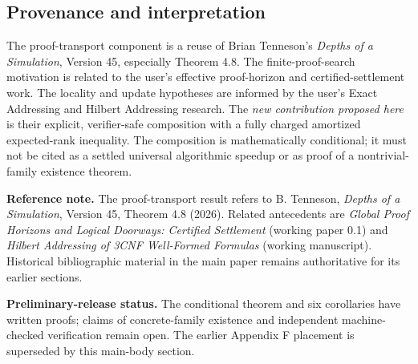 \documentclass[11pt,letterpaper]{article}
\theoremstyle{definition}
\theoremstyle{remark}
\begin{document}
\subsection{Provenance and interpretation}
The proof-transport component is a reuse of Brian Tenneson's \emph{Depths of a Simulation}, Version 45, especially Theorem 4.8. The finite-proof-search motivation is related to the user's effective proof-horizon and certified-settlement work. The locality and update hypotheses are informed by the user's Exact Addressing and Hilbert Addressing research. The \emph{new contribution proposed here} is their explicit, verifier-safe composition with a fully charged amortized expected-rank inequality. The composition is mathematically conditional; it must not be cited as a settled universal algorithmic speedup or as proof of a nontrivial-family existence theorem.

\noindent\textbf{Reference note.} The proof-transport result refers to B. Tenneson, \emph{Depths of a Simulation}, Version 45, Theorem 4.8 (2026). Related antecedents are \emph{Global Proof Horizons and Logical Doorways: Certified Settlement} (working paper 0.1) and \emph{Hilbert Addressing of 3CNF Well-Formed Formulas} (working manuscript). Historical bibliographic material in the main paper remains authoritative for its earlier sections.


\noindent\textbf{Preliminary-release status.} The conditional theorem and six corollaries have written proofs; claims of concrete-family existence and independent machine-checked verification remain open. The earlier Appendix F placement is superseded by this main-body section.
\end{document}
